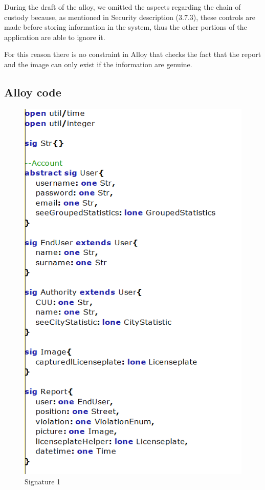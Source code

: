 During the draft of the alloy, we omitted the aspects regarding the chain of custody because, as mentioned in Security description (3.7.3), these controls are made before storing information in the system, thus the other portions of the application are able to ignore it.

For this reason there is no constraint in Alloy that checks the fact that the report and the image can only exist if the information are genuine.
\subsection{Alloy code}
\begin{figure}
	\centering
	\includegraphics[width=0.9\linewidth, height=0.8 \textheight]{Images/Alloy/codealloy1}
	\caption{Signature 1}
	\label{Signature 1}
\end{figure}

